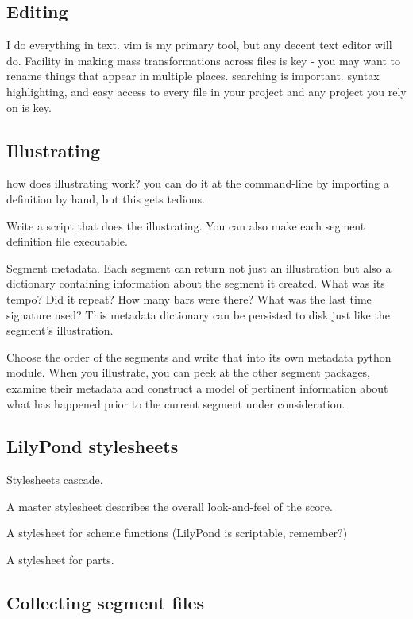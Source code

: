 \subsection{Editing}
\label{ssec:editing}

I do everything in text. vim is my primary tool, but any decent text editor
will do. Facility in making mass transformations across files is key - you may
want to rename things that appear in multiple places. searching is important.
syntax highlighting, and easy access to every file in your project and any
project you rely on is key.

\subsection{Illustrating}
\label{ssec:illustrating}

how does illustrating work? you can do it at the command-line by importing a
definition by hand, but this gets tedious.

Write a script that does the illustrating. You can also make each segment
definition file executable.

Segment metadata. Each segment can return not just an illustration but also a
dictionary containing information about the segment it created. What was its
tempo? Did it repeat? How many bars were there? What was the last time
signature used? This metadata dictionary can be persisted to disk just like the
segment's illustration.

Choose the order of the segments and write that into its own metadata python
module. When you illustrate, you can peek at the other segment packages,
examine their metadata and construct a model of pertinent information about
what has happened prior to the current segment under consideration.

\subsection{LilyPond stylesheets}
\label{ssec:lilypond-stylesheets}

Stylesheets cascade.

A master stylesheet describes the overall look-and-feel of the score.

A stylesheet for scheme functions (LilyPond is scriptable, remember?)

A stylesheet for parts.

\subsection{Collecting segment files}
\label{ssec:collecting-segment-files}

